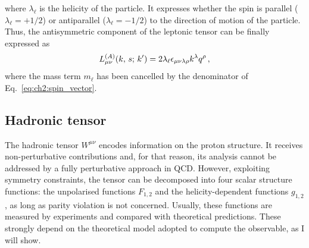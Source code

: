 where $\lambda_{\ell}$ is the helicity of the particle. It expresses whether the spin is parallel ($\lambda_{\ell} = +1/2$) or antiparallel ($\lambda_{\ell} = -1/2$) to the direction of motion of the particle. Thus, the antisymmetric component of the leptonic tensor can be finally expressed as
\begin{equation}
    L_{\mu \nu}^{(A)} \qty(k,\,s;\, k') = 2\lambda_{\ell} \epsilon_{\mu \nu \lambda \rho} k^{\lambda} q^{\rho} \,,
    \label{eq:lep_tens_anti}
\end{equation}
where the mass term $m_{\ell}$ has been cancelled by the denominator of Eq.~\eqref{eq:ch2:spin_vector}.

\subsection*{Hadronic tensor}
The hadronic tensor $W^{\mu \nu}$ encodes information on the proton structure. It receives non-perturbative contributions and, for that reason, its analysis cannot be addressed by a fully perturbative approach in QCD. However, exploiting symmetry constraints, the tensor can be decomposed into four scalar structure functions: the unpolarised functions $F_{1,2}$ and the helicity-dependent functions $g_{1,2}$, as long as parity violation is not concerned. Usually, these functions are measured by experiments and compared with theoretical predictions. These strongly depend on the theoretical model adopted to compute the observable, as I will show.%


